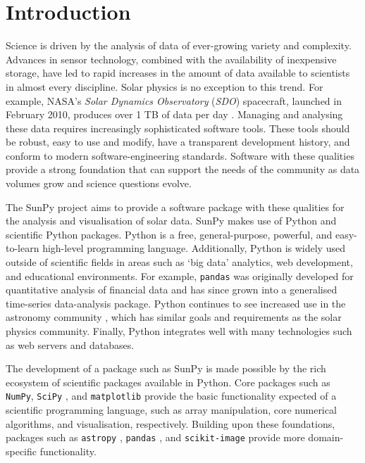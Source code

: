\section{Introduction}\label{sec:Intro}

Science is driven by the analysis of data of ever-growing variety and 
complexity. Advances in sensor technology, combined with the availability of 
inexpensive 
storage, have led to rapid increases in the amount of data available to scientists in almost
every discipline.  Solar physics is no exception to this trend. For example,
NASA's \textit{Solar Dynamics Observatory} (\textit{SDO}) spacecraft, launched
in February 2010, produces over 1 TB of data per day \citep{pesnell2012}. Managing and
analysing these data requires increasingly sophisticated software
tools. These tools should be robust, easy to use and modify, have a transparent
development history, and conform to modern software-engineering
standards. Software with these qualities provide a strong foundation that can support the
needs of the community as data volumes grow and science questions evolve.

The SunPy project aims to provide a software package with these qualities for 
the analysis and visualisation of solar data. SunPy makes
use of Python and scientific Python packages. Python is a free, general-purpose, 
powerful, and easy-to-learn high-level programming language. Additionally, Python is 
widely used outside of scientific fields in areas such as `big data' analytics, web 
development, and educational environments. For example, \texttt{pandas} \citep{mckinney2010, mckinney2012} was 
originally developed for quantitative analysis of financial data and has since 
grown into a generalised time-series data-analysis package. Python continues to 
see increased use in the astronomy community \citep{greenfield2011}, which has 
similar goals and requirements as the solar physics community. Finally, Python 
integrates well with many technologies such as web servers \citep{dolgert2008} and databases. 

The development of a package such as SunPy is made possible by the rich ecosystem of 
scientific packages available in Python. Core packages such as \texttt{NumPy}, 
\texttt{SciPy} \citep{jones2001}, and \texttt{matplotlib} \citep{hunter2007} provide 
the basic functionality expected of a scientific programming language,
such as array manipulation, core numerical algorithms, and visualisation, respectively.
Building upon these foundations, packages such as \texttt{astropy}
\citep[astronomy;][]{theastropycollaboration2013}, \texttt{pandas} \citep[time-series;][]{mckinney2012}, and \texttt{scikit-image} 
\citep[image processing;][]{vanderwalt2014} provide more domain-specific functionality.

